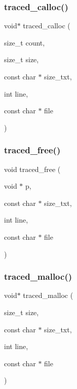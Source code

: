 \subsubsection{traced\+\_\+calloc()}
{\footnotesize\ttfamily void$\ast$ traced\+\_\+calloc (\begin{DoxyParamCaption}\item[{size\+\_\+t}]{count,  }\item[{size\+\_\+t}]{size,  }\item[{const char $\ast$}]{size\+\_\+txt,  }\item[{int}]{line,  }\item[{const char $\ast$}]{file }\end{DoxyParamCaption})}

\mbox{\label{memtrace_8h_a324b3ee7c799b67c4bae9dcdfa144dd3}} 
\subsubsection{traced\+\_\+free()}
{\footnotesize\ttfamily void traced\+\_\+free (\begin{DoxyParamCaption}\item[{void $\ast$}]{p,  }\item[{const char $\ast$}]{size\+\_\+txt,  }\item[{int}]{line,  }\item[{const char $\ast$}]{file }\end{DoxyParamCaption})}

\mbox{\label{memtrace_8h_a878d95f35f94bc40ca0f41d5630c10a0}} 
\subsubsection{traced\+\_\+malloc()}
{\footnotesize\ttfamily void$\ast$ traced\+\_\+malloc (\begin{DoxyParamCaption}\item[{size\+\_\+t}]{size,  }\item[{const char $\ast$}]{size\+\_\+txt,  }\item[{int}]{line,  }\item[{const char $\ast$}]{file }\end{DoxyParamCaption})}


